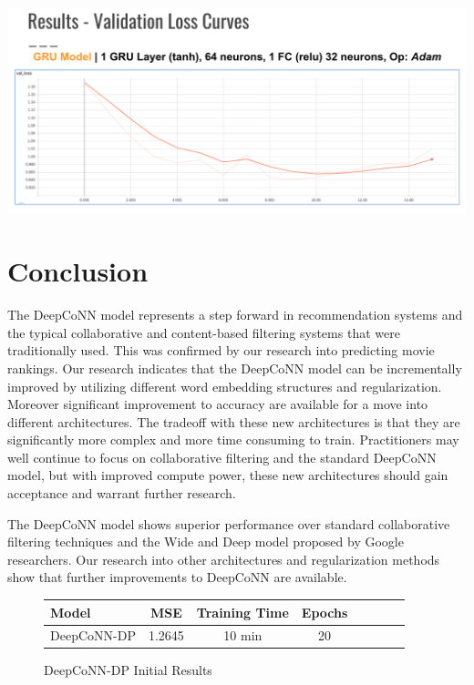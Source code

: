\documentclass[10pt,twocolumn,letterpaper]{article}
\begin{document}
\includegraphics[scale=0.38]{Loss_Graph.png}

\section{Conclusion}

The DeepCoNN model represents a step forward in recommendation systems and the typical collaborative and content-based filtering systems that were traditionally used. This was confirmed by our research into predicting movie rankings. Our research indicates that the DeepCoNN model can be incrementally improved by utilizing different word embedding structures and regularization. Moreover significant improvement to accuracy are available for a move into different architectures. The tradeoff with these new architectures is that they are significantly more complex and more time consuming to train. Practitioners may well continue to focus on collaborative filtering and the standard DeepCoNN model, but with improved compute power, these new architectures should gain acceptance and warrant further research.  

The DeepCoNN model shows superior performance over standard collaborative filtering techniques and the Wide and Deep model proposed by Google researchers. Our research into other architectures and regularization methods show that further improvements to DeepCoNN are available.   






\begin{figure}[!ht]
\begin{center}
{\small
\begin{tabular}{l|ccccccc}
\hline
Model & MSE & Training Time & Epochs \\
\hline
DeepCoNN-DP & 1.2645 & 10 min & 20  \\
\hline
\end{tabular}
}
\end{center}
\caption{DeepCoNN-DP Initial Results}
\end{figure}
\end{document}

